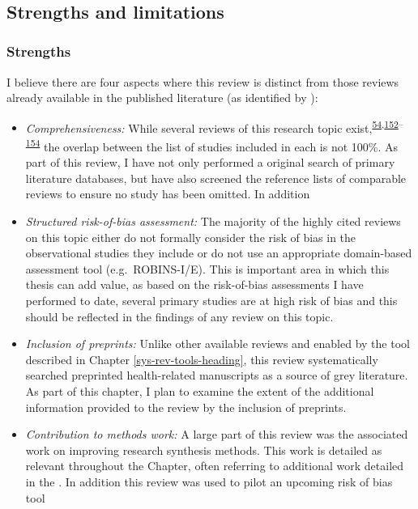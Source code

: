 \documentclass[a4paper, twoside]{templates/ociamthesis}
\providecommand{\tightlist}{%
  \setlength{\itemsep}{0pt}\setlength{\parskip}{0pt}}
\begin{document}
~

\hypertarget{strengths-and-limitations}{%
\subsection{Strengths and limitations}\label{strengths-and-limitations}}

\hypertarget{strengths}{%
\subsubsection{Strengths}\label{strengths}}

I believe there are four aspects where this review is distinct from those reviews already available in the published literature (as identified by ):

\begin{itemize}
\item
  \emph{Comprehensiveness:} While several reviews of this research topic exist,\textsuperscript{\protect\hyperlink{ref-chu2018}{54},\protect\hyperlink{ref-yang2020}{152}--\protect\hyperlink{ref-poly2020}{154}} the overlap between the list of studies included in each is not 100\%. As part of this review, I have not only performed a original search of primary literature databases, but have also screened the reference lists of comparable reviews to ensure no study has been omitted. In addition
\item
  \emph{Structured risk-of-bias assessment:} The majority of the highly cited reviews on this topic either do not formally consider the risk of bias in the observational studies they include or do not use an appropriate domain-based assessment tool (e.g.~ROBINS-I/E). This is important area in which this thesis can add value, as based on the risk-of-bias assessments I have performed to date, several primary studies are at high risk of bias and this should be reflected in the findings of any review on this topic.
\item
  \emph{Inclusion of preprints:} Unlike other available reviews and enabled by the tool described in Chapter \ref{sys-rev-tools-heading}, this review systematically searched preprinted health-related manuscripts as a source of grey literature. As part of this chapter, I plan to examine the extent of the additional information provided to the review by the inclusion of preprints.
\end{itemize}

\begin{itemize}
\tightlist
\item
  \emph{Contribution to methods work:} A large part of this review was the associated work on improving research synthesis methods. This work is detailed as relevant throughout the Chapter, often referring to additional work detailed in the . In addition this review was used to pilot an upcoming risk of bias tool
\end{itemize}
\end{document}
